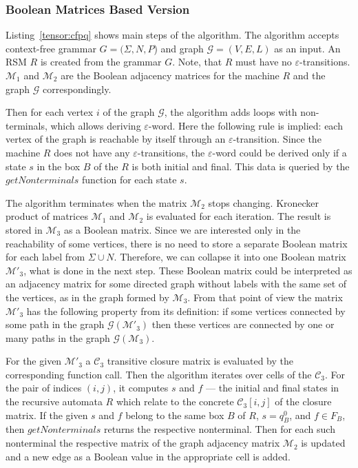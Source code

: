 
\subsubsection{Boolean Matrices Based Version}
Listing~\ref{tensor:cfpq} shows main steps of the algorithm.
The algorithm accepts context-free grammar $G=(\Sigma,N,P$) and graph $\mathcal{G}=(V,E,L)$ as an input.
An RSM $R$ is created from the grammar $G$.
Note, that $R$ must have no $\varepsilon$-transitions.
$\mathcal{M}_1$ and $\mathcal{M}_2$ are the Boolean adjacency matrices for the machine 
$R$ and the graph $\mathcal{G}$ correspondingly.

Then for each vertex $i$ of the graph $\mathcal{G}$, the algorithm adds loops 
with non-terminals, which allows deriving $\varepsilon$-word.
Here the following rule is implied: each vertex of the graph is reachable 
by itself through an $\varepsilon$-transition. Since the machine $R$ does 
not have any $\varepsilon$-transitions, the $\varepsilon$-word could be 
derived only if a state $s$ in the box $B$ of the $R$ is both initial and final.
This data is queried by the $getNonterminals$ function for each state $s$.

The algorithm terminates when the matrix $\mathcal{M}_2$ stops changing.
Kronecker product of matrices $\mathcal{M}_1$ and $\mathcal{M}_2$ is evaluated
for each iteration.
The result is stored in $\mathcal{M}_3$ as a Boolean matrix. Since we are interested
only in the reachability of some vertices, there is no need to store a separate
Boolean matrix for each label from $\Sigma \cup N$. Therefore, we can 
collapse it into one Boolean matrix $\mathcal{M}'_3$, what is done in the next step.
These Boolean matrix could be interpreted as an adjacency matrix for some directed graph
without labels with the same set of the vertices, as in the graph formed by $\mathcal{M}_3$.
From that point of view the matrix $\mathcal{M}'_3$ has the following property 
from its definition: if some vertices connected by some path in the graph $\mathcal{G}(\mathcal{M}'_3)$ then these vertices are
connected by one or many paths in the graph $\mathcal{G}(\mathcal{M}_3)$.

For the given $\mathcal{M}'_3$ a $\mathcal{C}_3$ transitive closure matrix
is evaluated by the corresponding function call. 
Then the algorithm iterates over cells of the $\mathcal{C}_3$.
For the pair of indices $(i,j)$, it computes $s$ and $f$ --- 
the initial and final states in the recursive automata $R$ which relate 
to the concrete $\mathcal{C}_3[i,j]$ of the closure matrix.
If the given $s$ and $f$ belong to the same box $B$ of $R$, $s = q_B^0$, 
and $f \in F_B$, then $getNonterminals$ returns the respective nonterminal.
Then for each such nonterminal the respective matrix of the graph adjacency 
matrix $\mathcal{M}_2$ is updated and a new edge as a Boolean value in the 
appropriate cell is added.

